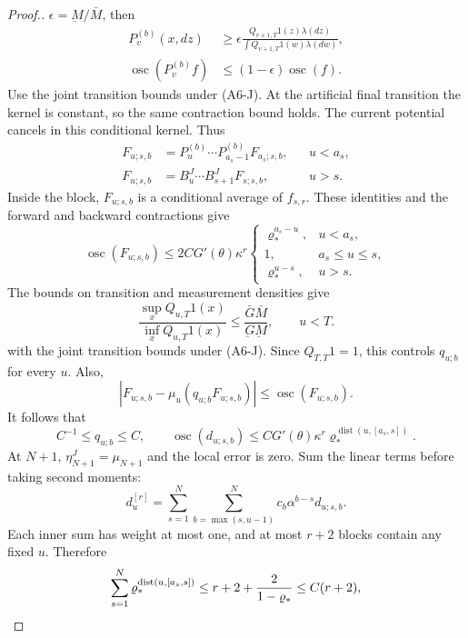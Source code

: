 \documentclass[11pt]{article}
\theoremstyle{thmstylethree}%
\begin{document}
\begin{proof}[Proof.]
{$\epsilon=\underbar M/\bar M$, then
\begin{align}
P_v^{(b)}(x,dz)
&\geq\epsilon\frac{Q_{v+1,T}1(z)\lambda(dz)}
 {\int Q_{v+1,T}1(w)\lambda(dw)},
\label{eq:weak-bias-forward-minorization}\\
\operatorname{osc}(P_v^{(b)}f)&\leq(1-\epsilon)\operatorname{osc}(f).
\label{eq:weak-bias-normalized-semigroup-contraction}
\end{align}
Use the joint transition bounds under (A6-J). At the artificial final
transition the kernel is constant, so the same contraction bound holds.
The current potential cancels in this conditional kernel. Thus
\begin{align*}
F_{u;s,b}&=P_u^{(b)}\cdots P_{a_s-1}^{(b)}F_{a_s;s,b},&&u<a_s,\\
F_{u;s,b}&=B_u^J\cdots B_{s+1}^JF_{s;s,b},&&u>s.
\end{align*}
Inside the block, $F_{u;s,b}$ is a conditional average of $f_{s,r}$.
These identities and the forward and backward contractions give
\[
\operatorname{osc}(F_{u;s,b})\leq 2CG'(\theta)\kappa^r
\begin{cases}
\varrho_*^{a_s-u},&u<a_s,\\
1,&a_s\leq u\leq s,\\
\varrho_*^{u-s},&u>s.
\end{cases}
\]
The bounds on transition and measurement densities give
\begin{equation}
\frac{\sup_x Q_{u,T}1(x)}{\inf_x Q_{u,T}1(x)}
\leq\frac{\bar G\bar M}{\underbar G\underbar M},\qquad u<T.
\label{eq:weak-bias-uniform-normalizer-ratio}
\end{equation}
with the joint transition bounds under (A6-J). Since $Q_{T,T}1=1$,
this controls $q_{u;b}$ for every $u$. Also,
\[
|F_{u;s,b}-\mu_u(q_{u;b}F_{u;s,b})|\leq\operatorname{osc}(F_{u;s,b}).
\]
It follows that
\begin{equation}
C^{-1}\leq q_{u;b}\leq C,\qquad
\operatorname{osc}(d_{u;s,b})\leq CG'(\theta)\kappa^r
 \varrho_*^{\operatorname{dist}(u,[a_s,s])}.
\label{eq:logfree-local-bounds}
\end{equation}
At $N+1$, $\eta_{N+1}^J=\mu_{N+1}$ and the local error is zero.
\endgraf
Sum the linear terms before taking second moments:
\[
d_u^{[r]}=\sum_{s=1}^N\sum_{b=\max(s,u-1)}^N
 c_b\alpha^{b-s}d_{u;s,b}.
\]
Each inner sum has weight at most one, and at most $r+2$ blocks
contain any fixed $u$. Therefore
\begin{align}
\sum_{s=1}^N\varrho_*^{\operatorname{dist}(u,[a_s,s])}
&\leq r+2+\frac{2}{1-\varrho_*}\leq C(r+2),\notag\\

\end{align}}
\end{proof}
\end{document}

